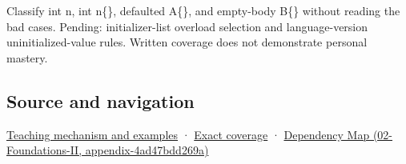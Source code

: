 Classify int n, int n\{\}, defaulted A\{\}, and empty-body B\{\} without reading the bad cases. Pending: initializer-list overload selection and language-version uninitialized-value rules. Written coverage does not demonstrate personal mastery.

\subsection{Source and navigation}\label{appendix-ba8c1a9fe03f-source-and-navigation}

\hyperref[01-foundations-i-ch003-empty-syntax-does-not-promise-initialized-members]{Teaching mechanism and examples} · \hyperref[appendix-fd090d982a15-m009---parts-127-147]{Exact coverage} · \href{../02-Foundations-II/main.pdf\#nameddest=appendix-4ad47bdd269a}{Dependency Map (02-Foundations-II, appendix-4ad47bdd269a)}
